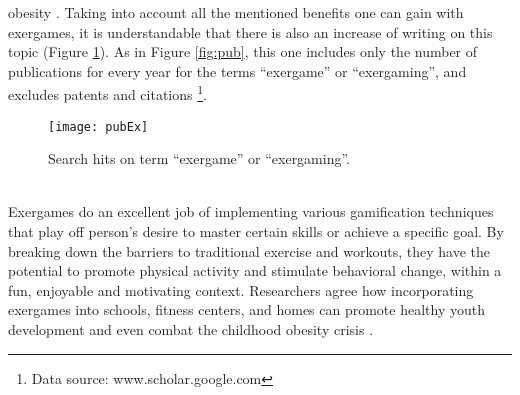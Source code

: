 obesity \cite{taylor2015use, barry2014role, webster2014systematic}.
Taking into account all the mentioned benefits one can gain with exergames, it is understandable that there is also an increase of writing on this topic (Figure \ref{fig:pubEx}). As in Figure \ref{fig:pub}, this one includes only the number of publications for every year for the terms ``exergame'' or ``exergaming'', and excludes patents and citations \footnote{Data source: www.scholar.google.com}. \\
\begin{figure}[h]
    \centering
    \texttt{[image: pubEx]}
    \caption{Search hits on term ``exergame'' or ``exergaming''.}
    \label{fig:pubEx}
\end{figure}\\
Exergames do an excellent job of implementing various gamification techniques that play off person's desire to master certain skills or achieve a specific goal. By breaking down the barriers to traditional exercise and workouts, they have the potential to promote physical activity and stimulate behavioral change, within a fun, enjoyable and motivating context. Researchers agree how incorporating exergames into schools, fitness centers, and homes can promote healthy youth development and even combat the childhood obesity crisis \cite{staiano2011exergames}.
